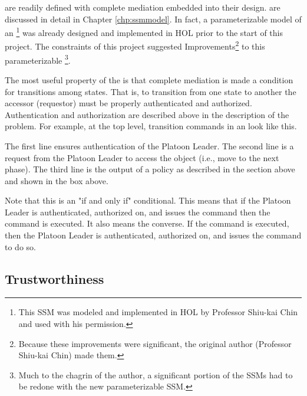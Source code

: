 \documentclass[../../main/main.tex]{subfiles}
\begin{document}
 are readily defined with complete mediation embedded into their design.   are discussed in detail in Chapter \ref{chp:ssmmodel}.  In fact, a parameterizable model of an \footnote{This SSM was modeled and implemented in HOL by Professor Shiu-kai Chin and used with his permission.} was already designed and implemented in HOL prior to the start of this project.  The constraints of this project suggested Improvements\footnote{Because these improvements were significant, the original author (Professor Shiu-kai Chin) made them.} to this parameterizable \footnote{Much to the chagrin of the author, a significant portion of the SSMs had to be redone with the new parameterizable SSM.}.

The most useful property of the  is that complete mediation is made a condition for transitions among states.  That is, to transition from one state to another the accessor (requestor) must be properly authenticated and authorized. Authentication and authorization are described above in the description of the problem.   For example, at the top level, transition commands in an  look like this.


The first line ensures authentication of the Platoon Leader.  The second line is a request from the Platoon Leader to access the object (i.e., move to the next phase).  The third line is the output of a policy as described in the section above and shown in the box above. 

Note that this is an "if and only if" conditional.  This means that if the Platoon Leader is authenticated, authorized on, and issues the command then the command is executed.  It also means the converse.  If the command is executed, then the Platoon Leader is authenticated, authorized on, and issues the command to do so.  

\subsection{Trustworthiness}
\end{document}
